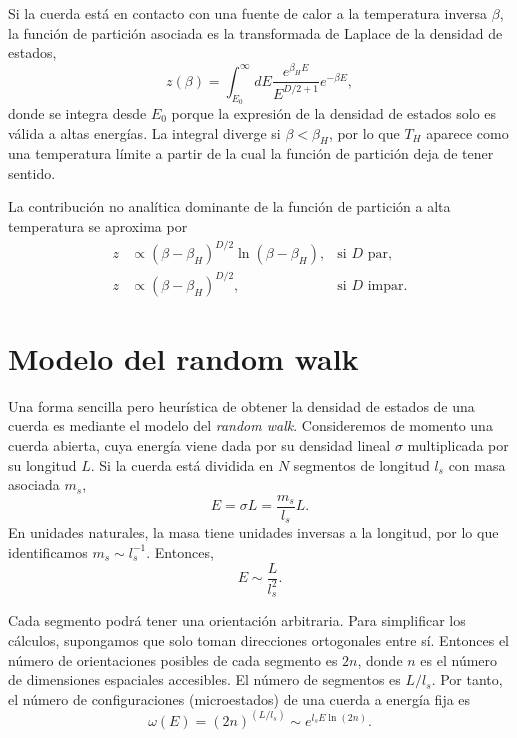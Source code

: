 Si la cuerda está en contacto con una fuente de calor a la temperatura inversa $\beta$, la función de partición asociada es la transformada de Laplace de la densidad de estados,
\begin{equation}
  z(\beta)=\int^\infty_{E_0} dE \frac{e^{\beta_H E}}{{E^{D/2+1}}}e^{-\beta E},
\end{equation}
donde se integra desde $E_0$ porque la expresión de la densidad de estados solo es válida a altas
energías.
La integral diverge si $\beta < \beta_H$, por lo que $T_H$ aparece como una temperatura límite
a partir de la cual la función de partición deja de tener sentido.

La contribución no analítica dominante de la función de partición a alta temperatura se aproxima
por 
\begin{equation}
  \begin{aligned}
    z&\propto(\beta-\beta_H)^{D/2}\ln(\beta-\beta_H), &\text{si $D$ par,}\\
    z&\propto(\beta-\beta_H)^{D/2}, &\text{si $D$ impar}.
  \end{aligned}
  \label{eq:zp}
\end{equation}

\section{Modelo del random walk}

Una forma sencilla pero heurística de obtener la densidad de estados 
de una cuerda es mediante el modelo del \emph{random walk}.
Consideremos de momento una cuerda abierta, 
cuya energía viene dada por su densidad lineal $\sigma$ multiplicada por su longitud $L$.
Si la cuerda está dividida en $N$ segmentos de longitud $l_s$ con masa asociada $m_s$, 
\begin{equation}
  E = \sigma L  =  \frac{m_s}{l_s} L.
\end{equation}
En unidades naturales, la masa tiene unidades inversas a la longitud, por lo que identificamos $m_s\sim l_s^{-1}$.
Entonces,
\begin{equation}
  E \sim \frac{L}{l_s^2}.
\end{equation}

Cada segmento podrá tener una orientación arbitraria. 
Para simplificar los cálculos, supongamos que solo toman direcciones ortogonales entre sí.
Entonces el número de orientaciones posibles de cada segmento es $2n$, donde $n$ es el número de dimensiones espaciales accesibles.
El número de segmentos es $L/l_s$.
Por tanto, el número de configuraciones (microestados) de una cuerda a energía fija es
\begin{equation}
  \omega(E)=(2n)^{(L/l_s)}\sim e^{l_s E \ln (2n)}.
\end{equation}


